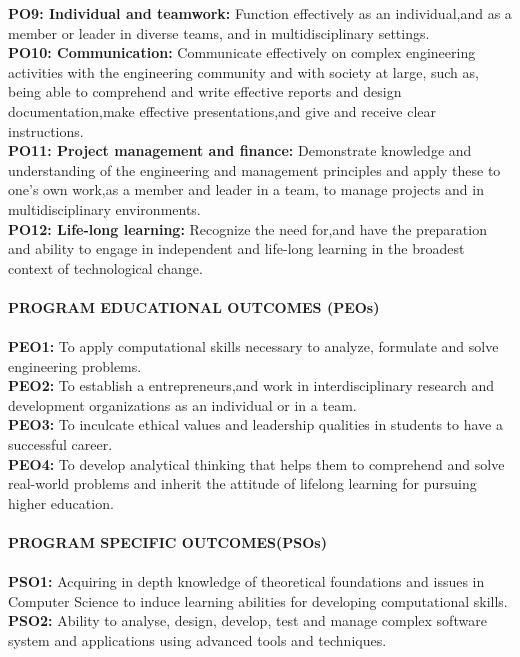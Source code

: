 \textbf{PO9: Individual and teamwork:} Function effectively as an individual,and as a member or leader in diverse teams, and in multidisciplinary settings.\\
\textbf{PO10: Communication:} Communicate effectively on complex engineering activities with the engineering community and with society at large, such as, being able to comprehend and write effective reports and design documentation,make effective presentations,and give and receive clear instructions.\\
\textbf{PO11: Project management and finance:} Demonstrate knowledge and understanding of the engineering and management principles and apply these to one’s own work,as a member and leader in a team, to manage projects and in multidisciplinary environments.\\
\textbf{PO12: Life-long learning:} Recognize the need for,and have the preparation and ability to engage in independent and life-long learning in the broadest context of technological change.
\\
\\
\textbf{PROGRAM EDUCATIONAL OUTCOMES (PEOs)}
\\
\\
\textbf{PEO1:} To apply computational skills necessary to analyze, formulate and solve engineering problems.
\\
\textbf{PEO2:} To establish a entrepreneurs,and work in interdisciplinary research and development organizations as an individual or in a team.
\\
\textbf{PEO3:} To inculcate ethical values and leadership qualities in students to have a successful career.
\\
\textbf{PEO4:} To develop analytical thinking that helps them to comprehend and solve real-world problems and inherit the attitude of lifelong learning for pursuing higher education.
\\
\\
\textbf{PROGRAM SPECIFIC OUTCOMES(PSOs)}
\\
\\
\textbf{PSO1:} Acquiring in depth knowledge of theoretical foundations and issues in Computer Science to induce learning abilities for developing computational skills.
\\
\textbf{PSO2:} Ability to analyse, design, develop, test and manage complex software system and applications using advanced tools and techniques.
